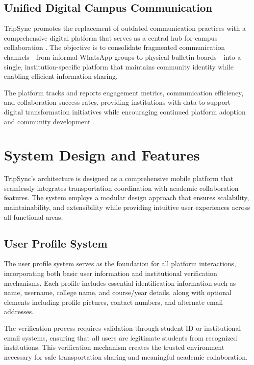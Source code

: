 \documentclass[conference]{IEEEtran}
\begin{document}
\subsection{Unified Digital Campus Communication}

TripSync promotes the replacement of outdated communication practices with a comprehensive digital platform that serves as a central hub for campus collaboration \cite{ref1}\cite{ref2}. The objective is to consolidate fragmented communication channels—from informal WhatsApp groups to physical bulletin boards—into a single, institution-specific platform that maintains community identity while enabling efficient information sharing.

The platform tracks and reports engagement metrics, communication efficiency, and collaboration success rates, providing institutions with data to support digital transformation initiatives while encouraging continued platform adoption and community development \cite{ref3}.

\section{System Design and Features}

TripSync's architecture is designed as a comprehensive mobile platform that seamlessly integrates transportation coordination with academic collaboration features. The system employs a modular design approach that ensures scalability, maintainability, and extensibility while providing intuitive user experiences across all functional areas.

\subsection{User Profile System}

The user profile system serves as the foundation for all platform interactions, incorporating both basic user information and institutional verification mechanisms. Each profile includes essential identification information such as name, username, college name, and course/year details, along with optional elements including profile pictures, contact numbers, and alternate email addresses.

The verification process requires validation through student ID or institutional email systems, ensuring that all users are legitimate students from recognized institutions. This verification mechanism creates the trusted environment necessary for safe transportation sharing and meaningful academic collaboration.
\end{document}
